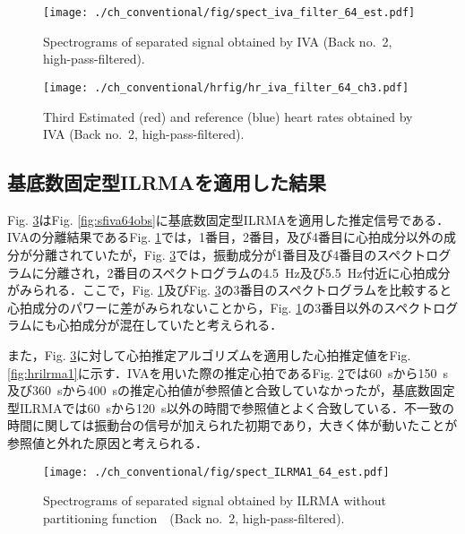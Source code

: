 \begin{figure}[tb]
\centering
\texttt{[image: ./ch\_conventional/fig/spect\_iva\_filter\_64\_est.pdf]}
\caption{Spectrograms of separated signal obtained by IVA (Back no.~2, high-pass-filtered).}
\label{fig:sfiva64est}
\end{figure}

\begin{figure}[tb]
\centering
\texttt{[image: ./ch\_conventional/hrfig/hr\_iva\_filter\_64\_ch3.pdf]}
  \caption{Third Estimated (red) and reference (blue) heart rates obtained by IVA (Back no.~2, high-pass-filtered).}
  \label{fig:fhriva64ch3}
\end{figure}


\subsection{基底数固定型ILRMAを適用した結果}
\label{sec:conv:resultilrma1}
Fig. \ref{fig:silrma1}はFig. \ref{fig:sfiva64obs}に基底数固定型ILRMAを適用した推定信号である．IVAの分離結果であるFig. \ref{fig:sfiva64est}では，1番目，2番目，及び4番目に心拍成分以外の成分が分離されていたが，Fig. \ref{fig:silrma1}では，振動成分が1番目及び4番目のスペクトログラムに分離され，2番目のスペクトログラムの4.5~Hz及び5.5~Hz付近に心拍成分がみられる．ここで，Fig. \ref{fig:sfiva64est}及びFig. \ref{fig:silrma1}の3番目のスペクトログラムを比較すると心拍成分のパワーに差がみられないことから，Fig. \ref{fig:sfiva64est}の3番目以外のスペクトログラムにも心拍成分が混在していたと考えられる．

また，Fig. \ref{fig:silrma1}に対して心拍推定アルゴリズムを適用した心拍推定値をFig. \ref{fig:hrilrma1}に示す．IVAを用いた際の推定心拍であるFig. \ref{fig:fhriva64ch3}では60~sから150~s及び360~sから400~sの推定心拍値が参照値と合致していなかったが，基底数固定型ILRMAでは60~sから120~s以外の時間で参照値とよく合致している．不一致の時間に関しては振動台の信号が加えられた初期であり，大きく体が動いたことが参照値と外れた原因と考えられる．

\begin{figure}[tb]
\centering
\texttt{[image: ./ch\_conventional/fig/spect\_ILRMA1\_64\_est.pdf]}
\caption{Spectrograms of separated signal obtained by ILRMA without partitioning function　(Back no.~2, high-pass-filtered).}
\label{fig:silrma1}
\end{figure}

